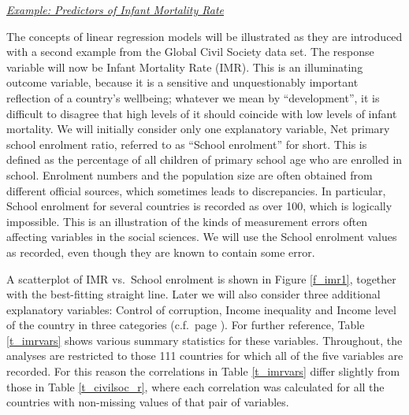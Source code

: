 \newpage
\underline{\emph{Example: Predictors of Infant Mortality Rate}}

The concepts of linear regression models will be illustrated as they are
introduced with a second example from the Global Civil Society data set.
The response variable will now be Infant Mortality Rate (IMR). This is
an illuminating outcome variable, because it is a sensitive and
unquestionably important reflection of a country's wellbeing; whatever
we mean by ``development'', it is difficult to disagree that high levels
of it should coincide with low levels of infant mortality. We will
initially consider only one explanatory variable, Net primary school
enrolment ratio, referred to as ``School enrolment'' for short. This is
defined as the percentage of all children of primary school age who are
enrolled in school. Enrolment numbers and the population size are
often obtained from different official sources, which sometimes leads to
discrepancies. In particular, School enrolment for several countries is
recorded as over 100, which is logically impossible. This is an
illustration of the kinds of measurement errors often affecting
variables in the social sciences. We will use the School enrolment
values as recorded, even though they are known to contain some error.

A scatterplot of IMR vs.\ School enrolment is shown in Figure
\ref{f_imr1}, together with the best-fitting straight line. Later
we will also consider three additional explanatory variables:
Control of corruption, Income inequality and Income level of the country
in three categories (c.f.\ page \pageref{p_civilsoc}). For further
reference, Table \ref{t_imrvars} shows various summary statistics for
these variables. Throughout, the analyses are restricted to those 111
countries for which all of the five variables are recorded. For this
reason the correlations in Table \ref{t_imrvars} differ slightly from
those in Table \ref{t_civilsoc_r}, where each correlation was calculated
for all the countries with non-missing values of that pair of
variables.


